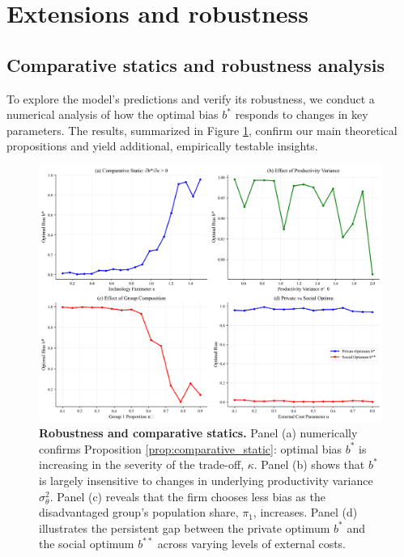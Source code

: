 \section{Extensions and robustness}

\subsection{Comparative statics and robustness analysis}

To explore the model's predictions and verify its robustness, we conduct a numerical analysis of how the optimal bias $b^*$ responds to changes in key parameters. The results, summarized in Figure \ref{fig:robustness}, confirm our main theoretical propositions and yield additional, empirically testable insights.

\begin{figure}[H]
    \centering
    \includegraphics[width=\textwidth]{../figures/figure_robustness.png}
    \caption[Robustness and comparative statics]{\textbf{Robustness and comparative statics.} 
    Panel (a) numerically confirms Proposition \ref{prop:comparative_static}: optimal bias $b^*$ is increasing in the severity of the trade-off, $\kappa$.
    Panel (b) shows that $b^*$ is largely insensitive to changes in underlying productivity variance $\sigma^2_\theta$.
    Panel (c) reveals that the firm chooses less bias as the disadvantaged group's population share, $\pi_1$, increases.
    Panel (d) illustrates the persistent gap between the private optimum $b^*$ and the social optimum $b^{**}$ across varying levels of external costs.}
    \label{fig:robustness}
\end{figure}

